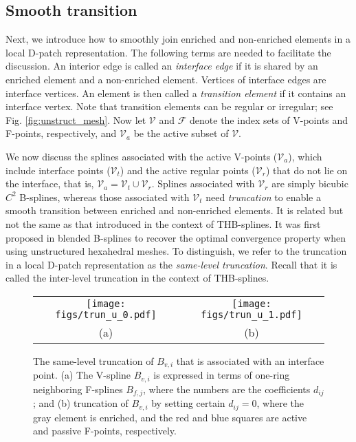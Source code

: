 \documentclass[graybox]{svmult}
\begin{document}
\subsection{Smooth transition}
\label{sec:transition}

Next, we introduce how to smoothly join enriched and non-enriched elements in a local D-patch representation. The following terms are needed to facilitate the discussion. An interior edge is called an \emph{interface edge} if it is shared by an enriched element and a non-enriched element. Vertices of interface edges are interface vertices. An element is then called a \emph{transition element} if it contains an interface vertex. Note that transition elements can be regular or irregular; see Fig. \ref{fig:unstruct_mesh}. Now let $\mathcal{V}$ and $\mathcal{F}$ denote the index sets of V-points and F-points, respectively, and $\mathcal{V}_a$ be the active subset of $\mathcal{V}$.

We now discuss the splines associated with the active V-points ($\mathcal{V}_{a}$), which include interface points ($\mathcal{V}_{t}$) and the active regular points ($\mathcal{V}_{r}$) that do not lie on the interface, that is, $\mathcal{V}_a=\mathcal{V}_{t} \cup \mathcal{V}_{r}$. Splines associated with $\mathcal{V}_{r}$ are simply bicubic $C^2$ B-splines, whereas those associated with $\mathcal{V}_{t}$ need \emph{truncation} to enable a smooth transition between enriched and non-enriched elements. It is related but not the same as that introduced in the context of THB-splines. It was first proposed in blended B-splines \cite{ref:wei18} to recover the optimal convergence property when using unstructured hexahedral meshes. To distinguish, we refer to the truncation in a local D-patch representation as the \emph{same-level truncation}. Recall that it is called the inter-level truncation in the context of THB-splines.

\begin{figure}[htb]
\centering
\begin{tabular}{cc}
\texttt{[image: figs/trun\_u\_0.pdf]} & \hspace{+1mm}
\texttt{[image: figs/trun\_u\_1.pdf]} \\
(a) & (b) \\
\end{tabular}
\caption{The same-level truncation of $B_{v,i}$ that is associated with an interface point. (a) The V-spline $B_{v,i}$ is expressed in terms of one-ring neighboring F-splines $B_{f\!,j}$, where the numbers are the coefficients $d_{ij}$; and (b) truncation of $B_{v,i}$ by setting certain $d_{ij}=0$, where the gray element is enriched, and the red and blue squares are active and passive F-points, respectively.}
\label{fig:trun_u}
\end{figure}
\end{document}
